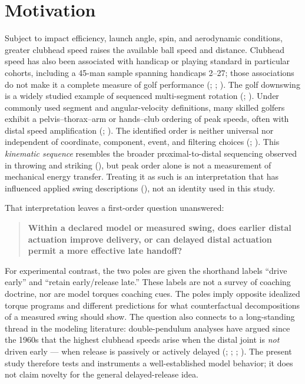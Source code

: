 \documentclass[
  letterpaper,
]{report}
\begin{document}
\section{Motivation}\label{motivation}

Subject to impact efficiency, launch angle, spin, and aerodynamic
conditions, greater clubhead speed raises the available ball speed and
distance. Clubhead speed has also been associated with handicap or
playing standard in particular cohorts, including a 45-man sample
spanning handicaps 2--27; those associations do not make it a complete
measure of golf performance (; ;
). The golf downswing
is a widely studied example of sequenced multi-segment rotation
(;
). Under commonly used
segment and angular-velocity definitions, many skilled golfers exhibit a
pelvis--thorax--arm or hands--club ordering of peak speeds, often with
distal speed amplification (; ). The identified
order is neither universal nor independent of coordinate, component,
event, and filtering choices (; ). This
\emph{kinematic sequence} resembles the broader proximal-to-distal
sequencing observed in throwing and striking
(), but peak order alone is not a
measurement of mechanical energy transfer. Treating it as such is an
interpretation that has influenced applied swing descriptions
(), not an identity used in
this study.

That interpretation leaves a first-order question unanswered:

\begin{quote}
\textbf{Within a declared model or measured swing, does earlier distal
actuation improve delivery, or can delayed distal actuation permit a
more effective late handoff?}
\end{quote}

For experimental contrast, the two poles are given the shorthand labels
``drive early'' and ``retain early/release late.'' These labels are not
a survey of coaching doctrine, nor are model torques coaching cues. The
poles imply opposite idealized torque programs and different predictions
for what counterfactual decompositions of a measured swing should show.
The question also connects to a long-standing thread in the modeling
literature: double-pendulum analyses have argued since the 1960s that
the highest clubhead speeds arise when the distal joint is \emph{not}
driven early --- when release is passively or actively delayed
(;
;
;
). The present
study therefore tests and instruments a well-established model behavior;
it does not claim novelty for the general delayed-release idea.
\end{document}
